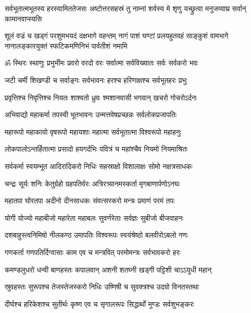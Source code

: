 \threelineshloka
{सर्वभूतात्मभूतस्य हरस्यामिततेजसः}
{अष्टोत्तरसहस्रं तु नाम्नां शर्वस्य मे शृणु}
{यच्छ्रुत्वा मनुजव्याघ्र सर्वान् कामानवाप्स्यसि}%


{शूलं वज्रं च खड्गं परशुमभयदं दक्षभागे वहन्तम्}
{नागं पाशं घण्टां प्रलयहुतवहं साङ्कुशं वामभागे}
{नानालङ्कारयुक्तं स्फटिकमणिनिभं पार्वतीशं नमामि}

\resetShloka
{}
\twolineshloka
{ॐ स्थिरः स्थाणुः प्रभुर्भीमः प्रवरो वरदो वरः}%
{सर्वात्मा सर्वविख्यातः सर्वः सर्वकरो भवः}%

\twolineshloka
{जटी चर्मी शिखण्डी च सर्वाङ्गः सर्वभावनः}%
{हरश्च हरिणाक्षश्च सर्वभूतहरः प्रभुः}%

\twolineshloka
{प्रवृत्तिश्च निवृत्तिश्च नियतः शाश्वतो ध्रुवः}%
{श्मशानवासी भगवान् खचरो गोचरोऽर्दनः}%

\twolineshloka
{अभिवाद्यो महाकर्मा तपस्वी भूतभावनः}%
{उन्मत्तवेषप्रच्छन्नः सर्वलोकप्रजापतिः}%

\twolineshloka
{महारूपो महाकायो वृषरूपो महायशाः}%
{महात्मा सर्वभूतात्मा विश्वरूपो महाहनुः}%

\twolineshloka
{लोकपालोऽन्तर्हितात्मा प्रसादो हयगर्दभिः}%
{पवित्रं च महांश्चैव नियमो नियमाश्रितः}%

\twolineshloka
{सर्वकर्मा स्वयम्भूत आदिरादिकरो निधिः}%
{सहस्राक्षो विशालाक्षः सोमो नक्षत्रसाधकः}%

\twolineshloka
{चन्द्रः सूर्यः शनिः केतुर्ग्रहो ग्रहपतिर्वरः}%
{अत्रिरत्र्यानमस्कर्ता मृगबाणार्पणोऽनघः}%

\twolineshloka
{महातपा घोरतपा अदीनो दीनसाधकः}%
{संवत्सरकरो मन्त्रः प्रमाणं परमं तपः}%

\twolineshloka
{योगी योज्यो महाबीजो महारेता महाबलः}%
{सुवर्णरेताः सर्वज्ञः सुबीजो बीजवाहनः}%

\twolineshloka
{दशबाहुस्त्वनिमिषो नीलकण्ठ उमापतिः}%
{विश्वरूपः स्वयंश्रेष्ठो बलवीरोऽबलो गणः}%

\twolineshloka
{गणकर्ता गणपतिर्दिग्वासाः काम एव च}%
{मन्त्रवित् परमो\hspace{.3ex}मन्त्रः सर्वभावकरो हरः}%

\twolineshloka
{कमण्डलुधरो धन्वी बाणहस्तः कपालवान्}%
{अशनी शतघ्नी खड्गी पट्टिशी चाऽऽयुधी महान्}%

\twolineshloka
{स्रुवहस्तः सुरूपश्च तेजस्तेजस्करो निधिः}%
{उष्णिषी च सुवक्त्रश्च उदग्रो विनतस्तथा}%

\twolineshloka
{दीर्घश्च हरिकेशश्च सुतीर्थः कृष्ण एव च}%
{सृगालरूपः सिद्धार्थो मुण्डः सर्वशुभङ्करः}%

